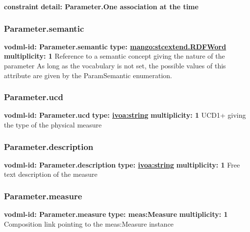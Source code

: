     \noindent \textbf{constraint} \newline
    \indent    \textbf{detail: Parameter.One association at the time
 }\newline


    \subsubsection{Parameter.semantic}
      \textbf{vodml-id: Parameter.semantic} \newline
      \textbf{type: \hyperref[sect:stcextend.RDFWord]{mango:stcextend.RDFWord}} \newline
      \textbf{multiplicity: 1} \newline 
      Reference to a semantic concept giving the nature of the parameter As long as the vocabulary is not set, the possible values of this attribute are given by the ParamSemantic enumeration.

    \subsubsection{Parameter.ucd}
      \textbf{vodml-id: Parameter.ucd} \newline
      \textbf{type: \hyperref[sect:ivoa]{ivoa:string}} \newline
      \textbf{multiplicity: 1} \newline 
      UCD1+ giving the type of the physical measure

    \subsubsection{Parameter.description}
      \textbf{vodml-id: Parameter.description} \newline
      \textbf{type: \hyperref[sect:ivoa]{ivoa:string}} \newline
      \textbf{multiplicity: 1} \newline 
      Free text description of the measure

    \subsubsection{Parameter.measure}
      \textbf{vodml-id: Parameter.measure} \newline
      \textbf{type: meas:Measure} \newline
      \textbf{multiplicity: 1} \newline 
      Composition link pointing to the meas:Measure instance

